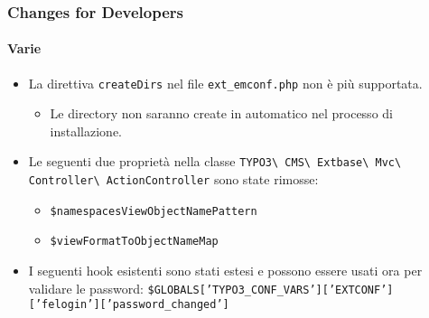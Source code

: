 \begin{frame}[fragile]
	\frametitle{Changes for Developers}
	\framesubtitle{Varie}

	\begin{itemize}
		\item La direttiva \texttt{createDirs} nel file \texttt{ext\_emconf.php} non è più supportata.

			\begin{itemize}\smaller
				\item[\ding{228}] Le directory non saranno create in automatico nel processo di installazione.
			\end{itemize}\normalsize

		\item Le seguenti due proprietà nella classe
			\texttt{TYPO3\textbackslash
				CMS\textbackslash
				Extbase\textbackslash
				Mvc\textbackslash
				Controller\textbackslash
				ActionController}\newline
			sono state rimosse:

			\begin{itemize}
				\item \texttt{\$namespacesViewObjectNamePattern}
				\item \texttt{\$viewFormatToObjectNameMap}
			\end{itemize}

		\item I seguenti hook esistenti sono stati estesi e possono essere usati ora
			per validare le password:\newline
			{\fontsize{8}{10} \selectfont \texttt{\$GLOBALS['TYPO3\_CONF\_VARS']['EXTCONF']['felogin']['password\_changed']}}

	\end{itemize}

\end{frame}


